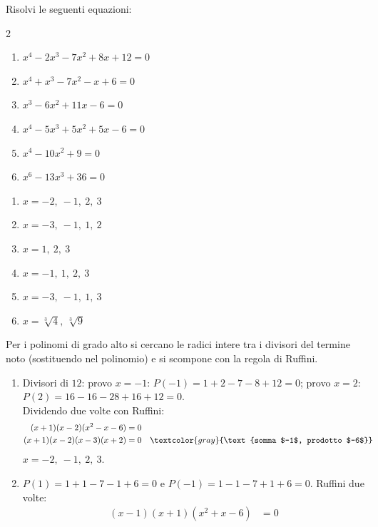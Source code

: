\begin{question}[ID=4.5, subtitle={Equazioni di grado superiore al secondo con scomposizioni complesse}, difficulty=difficile, tags={equazioni di grado superiore}]
Risolvi le seguenti equazioni:
\begin{multicols}{2}
\begin{enumerate}[leftmargin=3cm]
    \item $x^4 - 2x^3 - 7x^2 + 8x + 12 = 0$
    \item $x^4 + x^3 - 7x^2 - x + 6 = 0$
    \item $x^3 - 6x^2 + 11x - 6 = 0$
    \item $x^4 - 5x^3 + 5x^2 + 5x - 6 = 0$
    \item $x^4 - 10x^2 + 9 = 0$
    \item $x^6 - 13x^3 + 36 = 0$
\end{enumerate}
\end{multicols}
\begin{solution}
\begin{enumerate}
    \item $x=-2,\ -1,\ 2,\ 3$
    \item $x=-3,\ -1,\ 1,\ 2$
    \item $x=1,\ 2,\ 3$
    \item $x=-1,\ 1,\ 2,\ 3$
    \item $x=-3,\ -1,\ 1,\ 3$
    \item $x=\sqrt[3]{4},\ \sqrt[3]{9}$
\end{enumerate}
\end{solution}
\begin{explanation}
Per i polinomi di grado alto si cercano le radici intere tra i divisori del termine noto (sostituendo nel polinomio) e si scompone con la regola di Ruffini.
\begin{enumerate}
    \item Divisori di $12$: provo $x=-1$: $P(-1)=1+2-7-8+12=0$; provo $x=2$: $P(2)=16-16-28+16+12=0$. \\
    Dividendo due volte con Ruffini:
    \[\begin{aligned}
    (x+1)(x-2)(x^2-x-6) &= 0\\
    (x+1)(x-2)(x-3)(x+2) &= 0 && \textcolor{gray}{\text{somma $-1$, prodotto $-6$}}
    \end{aligned}\]
    $x=-2,\ -1,\ 2,\ 3$.
    \item $P(1)=1+1-7-1+6=0$ e $P(-1)=1-1-7+1+6=0$. Ruffini due volte:
    \[\begin{aligned}
    (x-1)(x+1)(x^2+x-6) &= 0\\

\end{aligned}\]
\end{enumerate}
\end{explanation}
\end{question}
